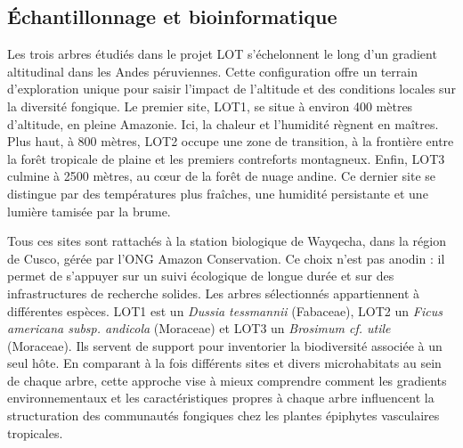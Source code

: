 \documentclass[alpha-refs,twocolumn]{wiley-article}
\begin{document}
\subsection{Échantillonnage et bioinformatique}



Les trois arbres étudiés dans le projet LOT s’échelonnent le long d’un gradient altitudinal dans les Andes péruviennes. Cette configuration offre un terrain d’exploration unique pour saisir l’impact de l’altitude et des conditions locales sur la diversité fongique. Le premier site, LOT1, se situe à environ 400 mètres d’altitude, en pleine Amazonie. Ici, la chaleur et l’humidité règnent en maîtres. Plus haut, à 800 mètres, LOT2 occupe une zone de transition, à la frontière entre la forêt tropicale de plaine et les premiers contreforts montagneux. Enfin, LOT3 culmine à 2500 mètres, au cœur de la forêt de nuage andine. Ce dernier site se distingue par des températures plus fraîches, une humidité persistante et une lumière tamisée par la brume.

Tous ces sites sont rattachés à la station biologique de Wayqecha, dans la région de Cusco, gérée par l’ONG Amazon Conservation. Ce choix n’est pas anodin : il permet de s’appuyer sur un suivi écologique de longue durée et sur des infrastructures de recherche solides. Les arbres sélectionnés appartiennent à différentes espèces. LOT1 est un \textit{Dussia tessmannii} (Fabaceae), LOT2 un \textit{Ficus americana subsp. andicola} (Moraceae) et LOT3 un \textit{Brosimum cf. utile} (Moraceae). Ils servent de support pour inventorier la biodiversité associée à un seul hôte. En comparant à la fois différents sites et divers microhabitats au sein de chaque arbre, cette approche vise à mieux comprendre comment les gradients environnementaux et les caractéristiques propres à chaque arbre influencent la structuration des communautés fongiques chez les plantes épiphytes vasculaires tropicales.
\end{document}
